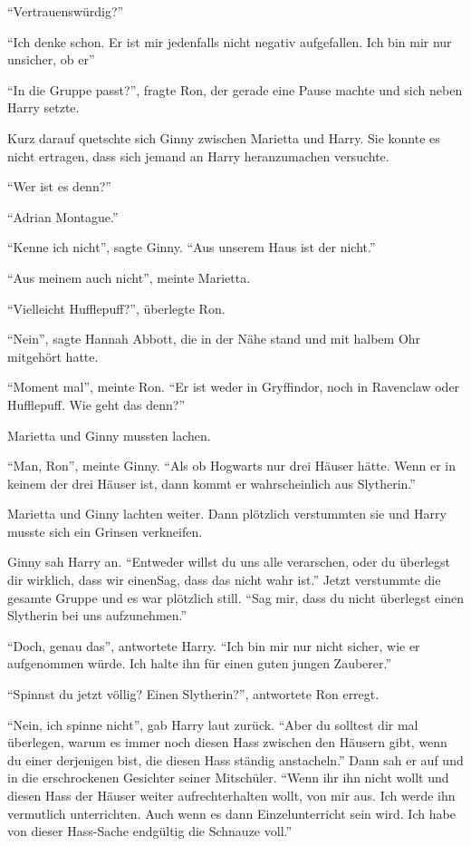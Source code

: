 \enquote{Vertrauenswürdig?}

\enquote{Ich denke schon. Er ist mir jedenfalls nicht negativ aufgefallen. Ich bin mir nur unsicher, ob er\abs}

\enquote{In die Gruppe passt?}, fragte Ron, der gerade eine Pause machte und sich neben Harry setzte.

Kurz darauf quetschte sich Ginny zwischen Marietta und Harry. Sie konnte es nicht ertragen, dass sich jemand an  Harry heranzumachen versuchte.

\enquote{Wer ist es denn?}

\enquote{Adrian Montague.}

\enquote{Kenne ich nicht}, sagte Ginny. \enquote{Aus unserem Haus ist der nicht.}

\enquote{Aus meinem auch nicht}, meinte Marietta.

\enquote{Vielleicht Hufflepuff?}, überlegte Ron.

\enquote{Nein}, sagte Hannah Abbott, die in der Nähe stand und mit halbem Ohr mitgehört hatte.

\enquote{Moment mal}, meinte Ron. \enquote{Er ist weder in Gryffindor, noch in Ravenclaw oder Hufflepuff. Wie geht das denn?}

Marietta und Ginny mussten lachen.

\enquote{Man, Ron}, meinte Ginny. \enquote{Als ob Hogwarts nur drei Häuser hätte. Wenn er in keinem der drei Häuser ist, dann kommt er wahrscheinlich aus Slytherin.}

Marietta und Ginny lachten weiter. Dann plötzlich verstummten sie und Harry musste sich ein Grinsen verkneifen.

Ginny sah Harry an. \enquote{Entweder willst du uns alle verarschen, oder du überlegst dir wirklich, dass wir einen\abs Sag, dass das nicht wahr ist.} Jetzt verstummte die gesamte Gruppe und es war plötzlich still. \enquote{Sag mir, dass du nicht überlegst einen Slytherin bei uns aufzunehmen.}

\enquote{Doch, genau das}, antwortete Harry. \enquote{Ich bin mir nur nicht sicher, wie er aufgenommen würde. Ich halte ihn für einen guten jungen Zauberer.}

\enquote{Spinnst du jetzt völlig? Einen Slytherin?}, antwortete Ron erregt.

\enquote{Nein, ich spinne nicht}, gab Harry laut zurück. \enquote{Aber du solltest dir mal überlegen, warum es immer noch diesen Hass zwischen den Häusern gibt, wenn du einer derjenigen bist, die diesen Hass ständig anstacheln.} Dann sah er auf und in die erschrockenen Gesichter seiner Mitschüler. \enquote{Wenn ihr ihn nicht wollt und diesen Hass der Häuser weiter aufrechterhalten wollt, von mir aus. Ich werde ihn vermutlich unterrichten. Auch wenn es dann Einzelunterricht sein wird. Ich habe von dieser Hass-Sache endgültig die Schnauze voll.}

